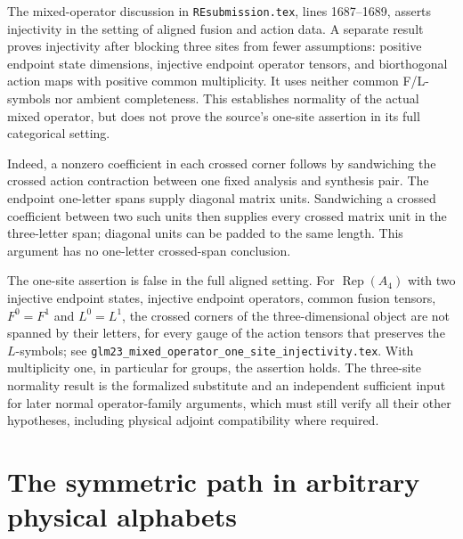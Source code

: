 \documentclass{article}
\begin{document}
The mixed-operator discussion in \texttt{REsubmission.tex}, lines
1687--1689, asserts injectivity in the setting of aligned fusion and
action data. A separate result proves injectivity after blocking three
sites from fewer assumptions: positive endpoint state dimensions,
injective endpoint operator tensors, and biorthogonal action maps with
positive common multiplicity. It uses neither common F/L-symbols nor
ambient completeness. This establishes normality of the actual mixed
operator, but does not prove the source's one-site assertion in its full
categorical setting.

Indeed, a nonzero coefficient in each crossed corner follows by
sandwiching the crossed action contraction between one fixed analysis
and synthesis pair. The endpoint one-letter spans supply diagonal
matrix units. Sandwiching a crossed coefficient between two such units
then supplies every crossed matrix unit in the three-letter span;
diagonal units can be padded to the same length. This argument has no
one-letter crossed-span conclusion.

The one-site assertion is false in the full aligned setting. For
$\operatorname{Rep}(A_4)$ with two injective endpoint states, injective
endpoint operators, common fusion tensors, $F^0=F^1$ and $L^0=L^1$, the
crossed corners of the three-dimensional object are not spanned by their
letters, for every gauge of the action tensors that preserves the
$L$-symbols; see
\texttt{glm23\_mixed\_operator\_one\_site\_injectivity.tex}. With
multiplicity one, in particular for groups, the assertion holds. The
three-site normality result is the formalized substitute and an
independent sufficient input for later normal operator-family arguments,
which must still verify all their other hypotheses, including physical
adjoint compatibility where required.

\section{The symmetric path in arbitrary physical alphabets}
\end{document}
